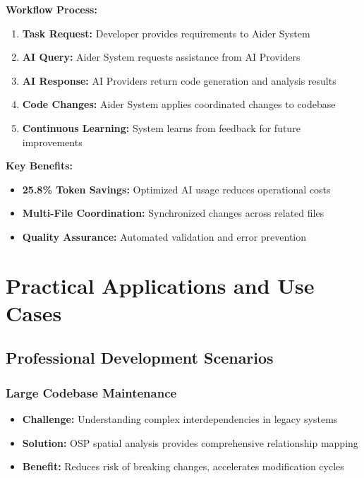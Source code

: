 \documentclass[12pt,a4paper]{article}
\begin{document}
\textbf{Workflow Process:}
\begin{enumerate}
    \item \textbf{Task Request:} Developer provides requirements to Aider System
    \item \textbf{AI Query:} Aider System requests assistance from AI Providers
    \item \textbf{AI Response:} AI Providers return code generation and analysis results
    \item \textbf{Code Changes:} Aider System applies coordinated changes to codebase
    \item \textbf{Continuous Learning:} System learns from feedback for future improvements
\end{enumerate}

\textbf{Key Benefits:}
\begin{itemize}
    \item \textbf{25.8\% Token Savings:} Optimized AI usage reduces operational costs
    \item \textbf{Multi-File Coordination:} Synchronized changes across related files
    \item \textbf{Quality Assurance:} Automated validation and error prevention
\end{itemize}

\section{Practical Applications and Use Cases}

\subsection{Professional Development Scenarios}

\subsubsection{Large Codebase Maintenance}
\begin{itemize}
    \item \textbf{Challenge:} Understanding complex interdependencies in legacy systems
    \item \textbf{Solution:} OSP spatial analysis provides comprehensive relationship mapping
    \item \textbf{Benefit:} Reduces risk of breaking changes, accelerates modification cycles
\end{itemize}
\end{document}
